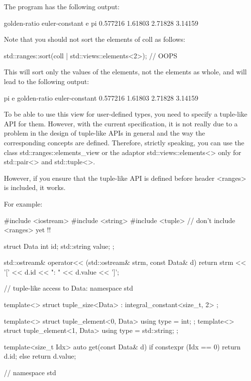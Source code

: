 The program has the following output:

\begin{shell}
golden-ratio euler-constant e pi
0.577216 1.61803 2.71828 3.14159
\end{shell}

Note that you should not sort the elements of coll as follows:

\begin{cpp}
std::ranges::sort(coll | std::views::elements<2>); // OOPS
\end{cpp}

This will sort only the values of the elements, not the elements as whole, and will lead to the following output:

\begin{shell}
pi e golden-ratio euler-constant
0.577216 1.61803 2.71828 3.14159
\end{shell}


To be able to use this view for user-defined types, you need to specify a tuple-like API for them. However, with the current specification, it is not really due to a problem in the design of tuple-like APIs in general and the way the corresponding concepts are defined. Therefore, strictly speaking, you can use the class std::ranges::elements\_view or the adaptor std::views::elements<> only for std::pair<> and std::tuple<>.

However, if you ensure that the tuple-like API is defined before header <ranges> is included, it works.

For example:


\begin{cpp}
#include <iostream>
#include <string>
#include <tuple>
// don’t include <ranges> yet !!

struct Data {
	int id;
	std::string value;
};

std::ostream& operator<< (std::ostream& strm, const Data& d) {
	return strm << '[' << d.id << ": " << d.value << ']';
}

// tuple-like access to Data:
namespace std {
	template<>
	struct tuple_size<Data> : integral_constant<size_t, 2> {
	};
	
	template<>
	struct tuple_element<0, Data> {
		using type = int;
	};
	template<>
	struct tuple_element<1, Data> {
		using type = std::string;
	};
	
	template<size_t Idx> auto get(const Data& d) {
		if constexpr (Idx == 0) {
			return d.id;
		}
		else {
			return d.value;
		}
	}
} // namespace std
\end{cpp}

